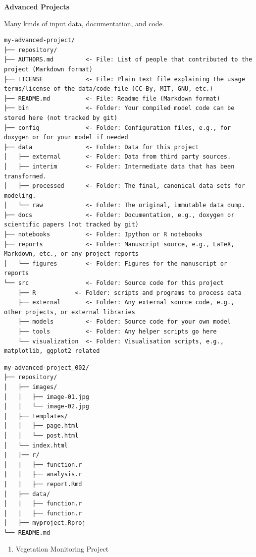 \documentclass[
]{book}
\providecommand{\tightlist}{%
  \setlength{\itemsep}{0pt}\setlength{\parskip}{0pt}}
\begin{document}
\textbf{Advanced Projects}

Many kinds of input data, documentation, and code.

\begin{verbatim}
my-advanced-project/
├── repository/
├── AUTHORS.md         <- File: List of people that contributed to the project (Markdown format)
├── LICENSE            <- File: Plain text file explaining the usage terms/license of the data/code file (CC-By, MIT, GNU, etc.)
├── README.md          <- File: Readme file (Markdown format)
├── bin                <- Folder: Your compiled model code can be stored here (not tracked by git)
├── config             <- Folder: Configuration files, e.g., for doxygen or for your model if needed
├── data               <- Folder: Data for this project
│   ├── external       <- Folder: Data from third party sources.
│   ├── interim        <- Folder: Intermediate data that has been transformed.
│   ├── processed      <- Folder: The final, canonical data sets for modeling.
│   └── raw            <- Folder: The original, immutable data dump.
├── docs               <- Folder: Documentation, e.g., doxygen or scientific papers (not tracked by git)
├── notebooks          <- Folder: Ipython or R notebooks
├── reports            <- Folder: Manuscript source, e.g., LaTeX, Markdown, etc., or any project reports
│   └── figures        <- Folder: Figures for the manuscript or reports
└── src                <- Folder: Source code for this project
    ├── R           <- Folder: scripts and programs to process data
    ├── external       <- Folder: Any external source code, e.g., other projects, or external libraries
    ├── models         <- Folder: Source code for your own model
    ├── tools          <- Folder: Any helper scripts go here
    └── visualization  <- Folder: Visualisation scripts, e.g., matplotlib, ggplot2 related
\end{verbatim}

\begin{verbatim}
my-advanced-project_002/
├── repository/
│   ├── images/
│   │   ├── image-01.jpg
│   │   └── image-02.jpg
│   ├── templates/
│   │   ├── page.html
│   │   └── post.html
│   └── index.html
|   |── r/
│   |   ├── function.r
|   |   ├── analysis.r
|   |   ├── report.Rmd
│   ├── data/
│   |   ├── function.r
│   |   ├── function.r
│   ├── myproject.Rproj
└── README.md
\end{verbatim}

\begin{enumerate}
\def\labelenumi{\arabic{enumi})}
\setcounter{enumi}{1}
\tightlist
\item
  Vegetation Monitoring Project
\end{enumerate}
\end{document}
